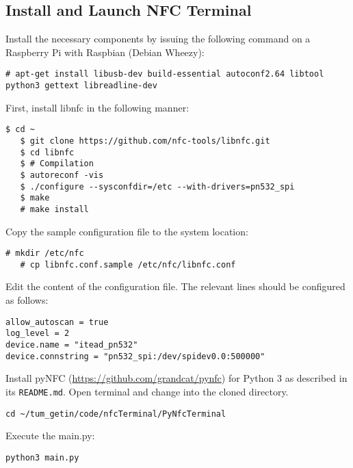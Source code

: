 \subsection{Install and Launch NFC Terminal}
Install the necessary components by issuing the following command on a Raspberry Pi with Raspbian (Debian Wheezy):
\begin{lstlisting}[breaklines=true]
   # apt-get install libusb-dev build-essential autoconf2.64 libtool python3 gettext libreadline-dev
\end{lstlisting}
%
First, install libnfc in the following manner:
\begin{lstlisting}[breaklines=true]
   $ cd ~
   $ git clone https://github.com/nfc-tools/libnfc.git
   $ cd libnfc
   $ # Compilation
   $ autoreconf -vis
   $ ./configure --sysconfdir=/etc --with-drivers=pn532_spi
   $ make
   # make install
\end{lstlisting}
Copy the sample configuration file to the system location:
\begin{lstlisting}[breaklines=true]
   # mkdir /etc/nfc
   # cp libnfc.conf.sample /etc/nfc/libnfc.conf
\end{lstlisting}


%
Edit the content of the configuration file. The relevant lines should be configured as follows:
\begin{lstlisting}[breaklines=true]
allow_autoscan = true
log_level = 2
device.name = "itead_pn532"
device.connstring = "pn532_spi:/dev/spidev0.0:500000"
\end{lstlisting}
%
Install pyNFC (\url{https://github.com/grandcat/pynfc}) for Python 3 as described in its \texttt{README.md}.
Open terminal and change into the cloned directory.
\begin{lstlisting}
cd ~/tum_getin/code/nfcTerminal/PyNfcTerminal
\end{lstlisting}
Execute the main.py:
\begin{lstlisting}
python3 main.py
\end{lstlisting}


%
%
%
%
%



